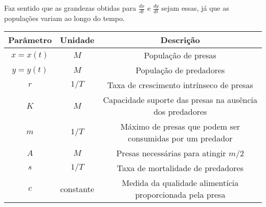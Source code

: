 Faz sentido que as grandezas obtidas para $\frac{dx}{dt}$ e $\frac{dy}{dt}$ sejam essas, já que as populações variam ao longo do tempo.

\begin{center}
\begin{tabular}{| c | c | c |}
\hline
Parâmetro & Unidade & Descrição\\
\hline
$x=x(t)$ & $M$ & População de presas\\
$y=y(t)$ & $M$ & População de predadores\\
$r$ & $1/T$ & Taxa de crescimento intrínseco de presas\\
$K$ & $M$ & Capacidade suporte das presas na ausência dos predadores\\
$m$ & $1/T$ & Máximo de presas que podem ser consumidas por um predador\\
$A$ & $M$ & Presas necessárias para atingir $m/2$\\
$s$ & $1/T$ & Taxa de mortalidade de predadores\\
$c$ & constante & Medida da qualidade alimentícia proporcionada pela presa\\
\hline
\end{tabular}
\end{center}
